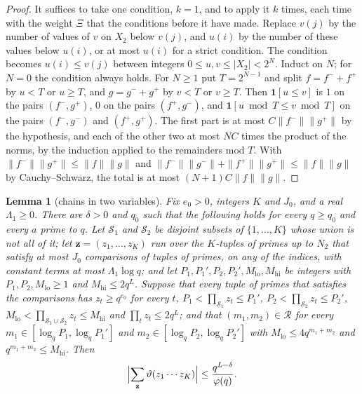 \documentclass[11pt]{article}
\newtheorem{lemma}[theorem]{Lemma}
\theoremstyle{definition}
\begin{document}
\begin{proof}
It suffices to take one condition, $k = 1$, and to apply it $k$ times, each time with the weight $\Xi$ that the
conditions before it have made. Replace $v(j)$ by the number of values of $v$ on $X_2$ below $v(j)$, and $u(i)$ by the
number of these values below $u(i)$, or at most $u(i)$ for a strict condition. The condition becomes $u(i) \le v(j)$
between integers $0 \le u, v \le |X_2| < 2^N$. Induct on $N$; for $N = 0$ the condition always holds. For $N \ge 1$ put
$T = 2^{N - 1}$ and split $f = f^- + f^+$ by $u < T$ or $u \ge T$, and $g = g^- + g^+$ by $v < T$ or $v \ge T$. Then
$\mathbf 1[u \le v]$ is $1$ on the pairs $(f^-, g^+)$, $0$ on the pairs $(f^+, g^-)$, and
$\mathbf 1[u \bmod T \le v \bmod T]$ on the pairs $(f^-, g^-)$ and $(f^+, g^+)$. The first part is at most
$C \|f^-\| \|g^+\|$ by the hypothesis, and each of the other two at most $NC$ times the product of the norms, by the
induction applied to the remainders mod $T$. With $\|f^-\| \|g^+\| \le \|f\| \|g\|$ and $\|f^-\| \|g^-\| + \|f^+\|
\|g^+\| \le \|f\| \|g\|$ by Cauchy--Schwarz, the total is at most $(N + 1) C \|f\| \|g\|$.
\end{proof}

\begin{lemma}[chains in two variables]\label{lem:chains-two}
Fix $e_0 > 0$, integers $K$ and $J_0$, and a real $\Lambda_1 \ge 0$. There are $\delta > 0$ and $q_0$ such that the
following holds for every $q \ge q_0$ and every $a$ prime to $q$. Let $\mathcal S_1$ and $\mathcal S_2$ be disjoint
subsets of $\{1, \dots, K\}$ whose union is not all of it; let $\mathbf z = (z_1, \dots, z_K)$ run over the $K$-tuples
of primes up to $N_2$ that satisfy at most $J_0$ comparisons of tuples of primes, on any of the indices, with constant
terms at most $\Lambda_1 \log q$; and let $P_1, P_1', P_2, P_2', M_{\mathrm{lo}}, M_{\mathrm{hi}}$ be integers with
$P_1, P_2, M_{\mathrm{lo}} \ge 1$ and $M_{\mathrm{hi}} \le 2q^L$. Suppose that every tuple of primes that satisfies
the comparisons has $z_t \ge q^{e_0}$ for every $t$, $P_1 < \prod_{\mathcal S_1} z_t \le P_1'$, $P_2 < \prod_{\mathcal
S_2} z_t \le P_2'$, $M_{\mathrm{lo}} < \prod_{\mathcal S_1 \cup \mathcal S_2} z_t \le M_{\mathrm{hi}}$ and $\prod_t
z_t \le 2q^L$; and that $(m_1, m_2) \in \mathcal R$ for every $m_1 \in [\log_q P_1, \log_q P_1']$ and $m_2 \in [\log_q
P_2, \log_q P_2']$ with $M_{\mathrm{lo}} \le 4q^{m_1 + m_2}$ and $q^{m_1 + m_2} \le M_{\mathrm{hi}}$. Then
\[
  \Bigl|\sum_{\mathbf z} \vartheta(z_1 \cdots z_K)\Bigr| \le \frac{q^{L - \delta}}{\varphi(q)}.
\]
\end{lemma}
\end{document}
